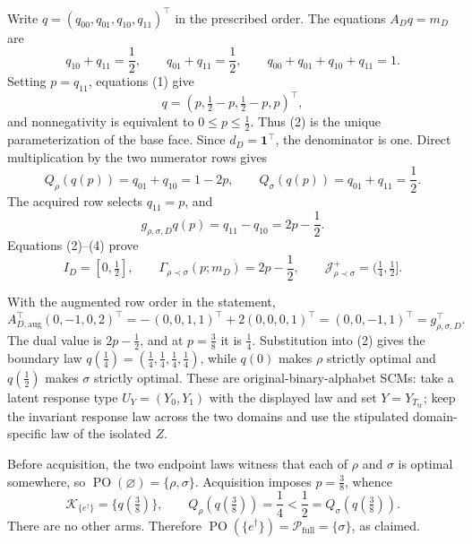 Write \(q=(q_{00},q_{01},q_{10},q_{11})^\top\) in the prescribed order. The equations \(A_Dq=m_D\) are
\[
q_{10}+q_{11}=\frac12,\qquad
q_{01}+q_{11}=\frac12,\qquad
q_{00}+q_{01}+q_{10}+q_{11}=1.\tag{1}
\]
Setting \(p=q_{11}\), equations (1) give
\[
q=(p,\tfrac12-p,\tfrac12-p,p)^\top,\tag{2}
\]
and nonnegativity is equivalent to \(0\leq p\leq\tfrac12\). Thus (2) is the unique parameterization of the base face. Since \(d_D=\mathbf1^\top\), the denominator is one. Direct multiplication by the two numerator rows gives
\[
Q_\rho(q(p))=q_{01}+q_{10}=1-2p,\qquad
Q_\sigma(q(p))=q_{01}+q_{11}=\frac12.\tag{3}
\]
The acquired row selects \(q_{11}=p\), and
\[
g_{\rho,\sigma,D}q(p)=q_{11}-q_{10}=2p-\frac12.\tag{4}
\]
Equations (2)--(4) prove
\[
I_D=[0,\tfrac12],\qquad
\Gamma_{\rho\prec\sigma}(p;m_D)=2p-\frac12,\qquad
\mathcal J_{\rho\prec\sigma}^+=(\tfrac14,\tfrac12].\tag{5}
\]

With the augmented row order in the statement,
\[
A_{D,\mathrm{aug}}^\top(0,-1,0,2)^\top
=-\,(0,0,1,1)^\top+2(0,0,0,1)^\top
=(0,0,-1,1)^\top
=g_{\rho,\sigma,D}^\top.\tag{6}
\]
The dual value is \(2p-\tfrac12\), and at \(p=\tfrac38\) it is \(\tfrac14\). Substitution into (2) gives the boundary law \(q(\tfrac14)=(\tfrac14,\tfrac14,\tfrac14,\tfrac14)\), while \(q(0)\) makes \(\rho\) strictly optimal and \(q(\tfrac12)\) makes \(\sigma\) strictly optimal. These are original-binary-alphabet SCMs: take a latent response type \(U_Y=(Y_0,Y_1)\) with the displayed law and set \(Y=Y_{T_{\mathrm{tr}}}\); keep the invariant response law across the two domains and use the stipulated domain-specific law of the isolated \(Z\).

Before acquisition, the two endpoint laws witness that each of \(\rho\) and \(\sigma\) is optimal somewhere, so
\(\operatorname{PO}(\varnothing)=\{\rho,\sigma\}\). Acquisition imposes \(p=\tfrac38\), whence
\[
\mathcal K_{\{e^\dagger\}}=\{q(\tfrac38)\},\qquad
Q_\rho(q(\tfrac38))=\frac14<\frac12=Q_\sigma(q(\tfrac38)).\tag{7}
\]
There are no other arms. Therefore
\(\operatorname{PO}(\{e^\dagger\})=\mathcal P_{\mathrm{full}}=\{\sigma\}\), as claimed.